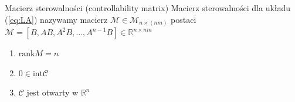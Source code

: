 \begin{definition}{Macierz sterowalności (controllability matrix)}{}
    Macierz sterowalności dla układu (\ref{eq:LA}) nazywamy macierz $\mathcal{M} \in \mathscr{M}_{n \times (nm)}$ postaci $\mathcal{M} = [B, AB, A^2B, \dots, A^{n-1}B] \in \mathbb{R}^{n \times nm}$
\end{definition}

\begin{theorem}{}{}
    \begin{enumerate}
        \item $\text{rank} M = n$
        \item $0 \in \text{int} \mathscr{C}$
        \item $\mathscr{C}$ jest otwarty w $\mathbb{R}^n$
    \end{enumerate}
\end{theorem}
